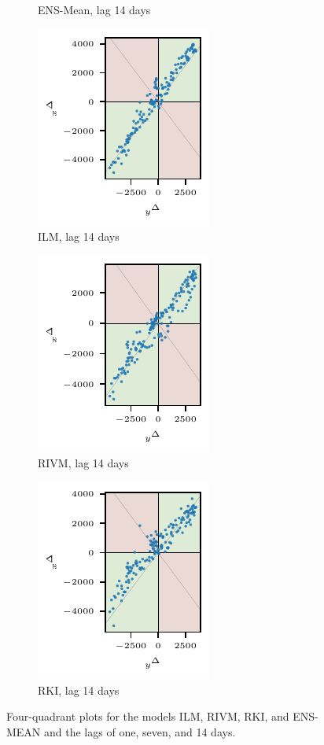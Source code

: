 \begin{figure}
\begin{subfigure}[t]{0.23\textwidth}
    \caption{ENS-Mean, lag 14 days}\label{fig:app-covid-4q-ens-mean-14}
\end{subfigure}\hspace{0.01\textwidth}
\begin{subfigure}[t]{0.23\textwidth}%
    \includegraphics{plots/covid_nowcast/30_ILM_4q_lag_14}
    \caption{ILM, lag 14 days}\label{fig:app-covid-4q-ilm-14}
\end{subfigure}\hspace{0.01\textwidth}
\begin{subfigure}[t]{0.23\textwidth}%
    \includegraphics{plots/covid_nowcast/30_RIVM_4q_lag_14}
    \caption{RIVM, lag 14 days}\label{fig:app-covid-4q-rivm-14}
\end{subfigure}\hspace{0.01\textwidth}%
\begin{subfigure}[t]{0.23\textwidth}
    \includegraphics{plots/covid_nowcast/30_RKI_4q_lag_14}
    \caption{RKI, lag 14 days}\label{fig:app-covid-4q-rki-14}
\end{subfigure}%
\caption{Four-quadrant plots for the models ILM, RIVM, RKI, and ENS-MEAN and the lags of one, seven, and 14 days. }
\label{fig:app-covid-4q}
\end{figure}
